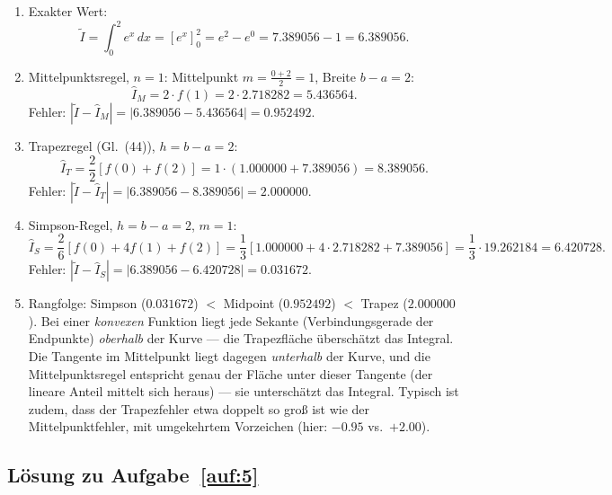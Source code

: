\documentclass[a4paper,11pt]{scrartcl}
\begin{document}
\begin{enumerate}[label=(\alph*)]
  \item Exakter Wert:
  \[ \tilde{I} = \int_0^2 e^x\,dx = \left[e^x\right]_0^2 = e^2 - e^0 = 7.389056 - 1 = 6.389056. \]
  \item Mittelpunktsregel, $n = 1$: Mittelpunkt $m = \frac{0 + 2}{2} = 1$, Breite $b - a = 2$:
  \[ \hat{I}_M = 2 \cdot f(1) = 2 \cdot 2.718282 = 5.436564. \]
  Fehler: $|\tilde{I} - \hat{I}_M| = |6.389056 - 5.436564| = 0.952492$.
  \item Trapezregel (Gl.~(44)), $h = b - a = 2$:
  \[ \hat{I}_T = \frac{2}{2}\left[f(0) + f(2)\right] = 1 \cdot (1.000000 + 7.389056) = 8.389056. \]
  Fehler: $|\tilde{I} - \hat{I}_T| = |6.389056 - 8.389056| = 2.000000$.
  \item Simpson-Regel, $h = b - a = 2$, $m = 1$:
  \[ \hat{I}_S = \frac{2}{6}\left[f(0) + 4f(1) + f(2)\right] = \frac{1}{3}\left[1.000000 + 4 \cdot 2.718282 + 7.389056\right] = \frac{1}{3} \cdot 19.262184 = 6.420728. \]
  Fehler: $|\tilde{I} - \hat{I}_S| = |6.389056 - 6.420728| = 0.031672$.
  \item Rangfolge: Simpson ($0.031672$) $<$ Midpoint ($0.952492$) $<$ Trapez ($2.000000$). Bei einer \emph{konvexen} Funktion liegt jede Sekante (Verbindungsgerade der Endpunkte) \emph{oberhalb} der Kurve --- die Trapezfläche überschätzt das Integral. Die Tangente im Mittelpunkt liegt dagegen \emph{unterhalb} der Kurve, und die Mittelpunktsregel entspricht genau der Fläche unter dieser Tangente (der lineare Anteil mittelt sich heraus) --- sie unterschätzt das Integral. Typisch ist zudem, dass der Trapezfehler etwa doppelt so groß ist wie der Mittelpunktfehler, mit umgekehrtem Vorzeichen (hier: $-0.95$ vs.\ $+2.00$).
\end{enumerate}

\subsection*{Lösung zu Aufgabe~\ref{auf:5}}
\end{document}
